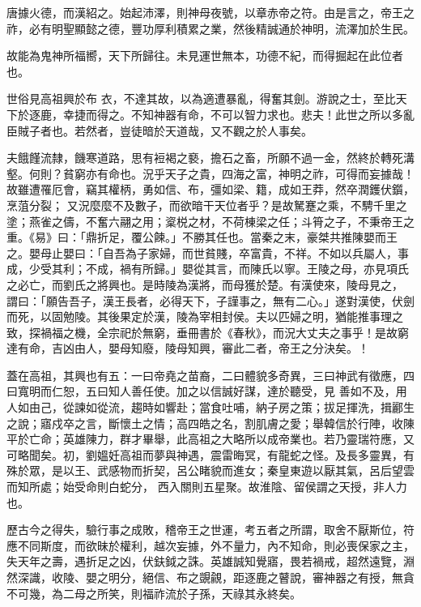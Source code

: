 \begin{pinyinscope}
 唐據火德，而漢紹之。始起沛澤，則神母夜號，以章赤帝之符。由是言之，帝王之祚，必有明聖顯懿之德，豐功厚利積累之業，然後精誠通於神明，流澤加於生民。



 故能為鬼神所福嚮，天下所歸往。未見運世無本，功德不紀，而得掘起在此位者也。



 世俗見高祖興於布
 衣，不達其故，以為適遭暴亂，得奮其劍。游說之士，至比天下於逐鹿，幸捷而得之。不知神器有命，不可以智力求也。悲夫！此世之所以多亂臣賊子者也。若然者，豈徒暗於天道哉，又不觀之於人事矣。



 夫餓饉流隸，饑寒道路，思有裋褐之褻，擔石之畜，所願不過一金，然終於轉死溝壑。何則？貧窮亦有命也。況乎天子之貴，四海之富，神明之祚，可得而妄據哉！故雖遭罹厄會，竊其權柄，勇如信、布，彊如梁、籍，成如王莽，然卒潤鑊伏鑕，烹菹分裂；
 又況麼麼不及數子，而欲暗干天位者乎？是故駑蹇之乘，不騁千里之塗；燕雀之儔，不奮六翮之用；楶棁之材，不荷棟梁之任；斗筲之子，不秉帝王之重。《易》曰：「鼎折足，覆公餗。」不勝其任也。當秦之末，豪桀共推陳嬰而王之。嬰母止嬰曰：「自吾為子家婦，而世貧賤，卒富貴，不祥。不如以兵屬人，事成，少受其利；不成，禍有所歸。」嬰從其言，而陳氏以寧。王陵之母，亦見項氏之必亡，而劉氏之將興也。是時陵為漢將，而母獲於楚。有漢使來，陵母見之，
 謂曰：「願告吾子，漢王長者，必得天下，子謹事之，無有二心。」遂對漢使，伏劍而死，以固勉陵。其後果定於漢，陵為宰相封侯。夫以匹婦之明，猶能推事理之致，探禍福之機，全宗祀於無窮，垂冊書於《春秋》，而況大丈夫之事乎！是故窮達有命，吉凶由人，嬰母知廢，陵母知興，審此二者，帝王之分決矣。！



 蓋在高祖，其興也有五：一曰帝堯之苗裔，二曰體貌多奇異，三曰神武有徵應，四曰寬明而仁恕，五曰知人善任使。加之以信誠好謀，達於聽受，見
 善如不及，用人如由己，從諫如從流，趨時如響赴；當食吐哺，納子房之策；拔足揮洗，揖酈生之說；寤戍卒之言，斷懷土之情；高四皓之名，割肌膚之愛；舉韓信於行陣，收陳平於亡命；英雄陳力，群才畢舉，此高祖之大略所以成帝業也。若乃靈瑞符應，又可略聞矣。初，劉媼妊高祖而夢與神遇，震雷晦冥，有龍蛇之怪。及長多靈異，有殊於眾，是以王、武感物而折契，呂公睹貌而進女；秦皇東遊以厭其氣，呂后望雲而知所處；始受命則白蛇分，
 西入關則五星聚。故淮陰、留侯謂之天授，非人力也。



 歷古今之得失，驗行事之成敗，稽帝王之世運，考五者之所謂，取舍不厭斯位，符應不同斯度，而欲昧於權利，越次妄據，外不量力，內不知命，則必喪保家之主，失天年之壽，遇折足之凶，伏鈇鉞之誅。英雄誠知覺寤，畏若禍戒，超然遠覽，淵然深識，收陵、嬰之明分，絕信、布之覬覦，距逐鹿之瞽說，審神器之有授，無貪不可幾，為二母之所笑，則福祚流於子孫，天祿其永終矣。




\end{pinyinscope}
